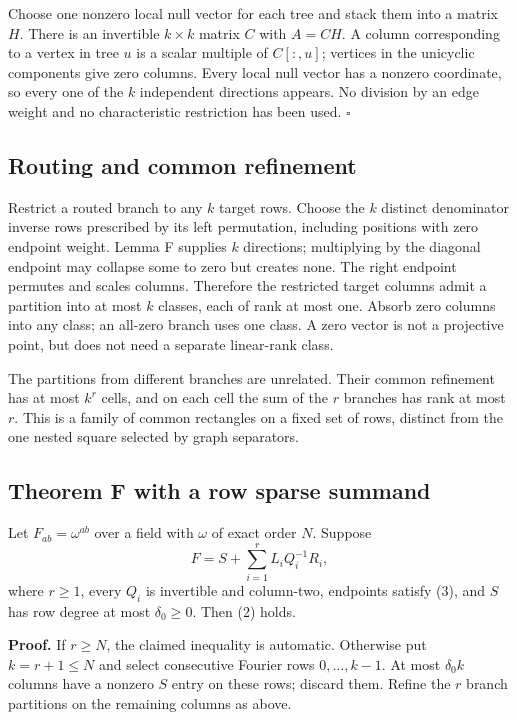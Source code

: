 \documentclass[
  11pt,
]{article}
\begin{document}
Choose one nonzero local null vector for each tree and stack them into a
matrix \(H\). There is an invertible \(k\times k\) matrix \(C\) with
\(A=CH\). A column corresponding to a vertex in tree \(u\) is a scalar
multiple of \(C[:,u]\); vertices in the unicyclic components give zero
columns. Every local null vector has a nonzero coordinate, so every one
of the \(k\) independent directions appears. No division by an edge
weight and no characteristic restriction has been used. \(\square\)

\subsection{Routing and common
refinement}\label{routing-and-common-refinement}

Restrict a routed branch to any \(k\) target rows. Choose the \(k\)
distinct denominator inverse rows prescribed by its left permutation,
including positions with zero endpoint weight. Lemma F supplies \(k\)
directions; multiplying by the diagonal endpoint may collapse some to
zero but creates none. The right endpoint permutes and scales columns.
Therefore the restricted target columns admit a partition into at most
\(k\) classes, each of rank at most one. Absorb zero columns into any
class; an all-zero branch uses one class. A zero vector is not a
projective point, but does not need a separate linear-rank class.

The partitions from different branches are unrelated. Their common
refinement has at most \(k^r\) cells, and on each cell the sum of the
\(r\) branches has rank at most \(r\). This is a family of common
rectangles on a fixed set of rows, distinct from the one nested square
selected by graph separators.

\subsection{Theorem F with a row sparse
summand}\label{theorem-f-with-a-row-sparse-summand}

Let \(F_{ab}=\omega^{ab}\) over a field with \(\omega\) of exact order
\(N\). Suppose \[
 F=S+\sum_{i=1}^{r}L_iQ_i^{-1}R_i,
\] where \(r\ge1\), every \(Q_i\) is invertible and column-two,
endpoints satisfy (3), and \(S\) has row degree at most
\(\delta_0\ge0\). Then (2) holds.

\textbf{Proof.} If \(r\ge N\), the claimed inequality is automatic.
Otherwise put \(k=r+1\le N\) and select consecutive Fourier rows
\(0,\ldots,k-1\). At most \(\delta_0k\) columns have a nonzero \(S\)
entry on these rows; discard them. Refine the \(r\) branch partitions on
the remaining columns as above.
\end{document}
